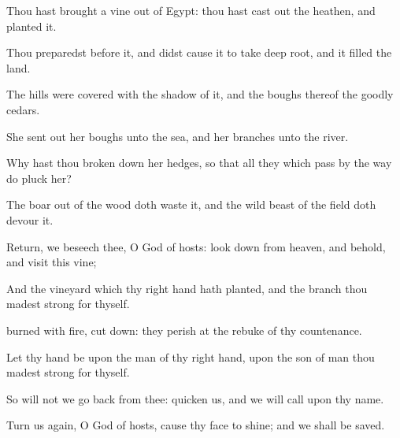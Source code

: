 {\Q {}Thou hast
brought a
vine out of
Egypt: thou hast cast
out the
heathen, and
planted it.


\par }{\Q {}Thou
preparedst
{}
before it, and didst cause it to take
deep
root, and it
filled the
land.


\par }{\Q {}The
hills were
covered with the
shadow of it, and the
boughs thereof
{} the
goodly
cedars.


\par }{\Q {}She sent
out her
boughs unto the
sea, and her
branches unto the
river.


\par }{\Q {}Why hast thou
{} broken
down her
hedges, so that all they which
pass by the
way do
pluck her?


\par }{\Q {}The
boar out of the
wood doth
waste it, and the wild
beast of the
field doth
devour it.


\par }{\Q {}Return, we beseech thee, O
God of
hosts: look
down from
heaven, and
behold, and
visit this
vine;


\par }{\Q {}And the
vineyard which thy right
hand hath
planted, and the
branch
{} thou madest
strong for thyself.


\par }{\Q {}
burned with
fire,
{} cut
down: they
perish at the
rebuke of thy
countenance.


\par }{\Q {}Let thy
hand be upon the
man of thy right
hand, upon the
son of
man
{} thou madest
strong for thyself.


\par }{\Q {}So will not we go
back from thee:
quicken us, and we will
call upon thy
name.


\par }{\Q {}Turn us
again, O
{}
God of
hosts, cause thy
face to
shine; and we shall be
saved.




\par }
